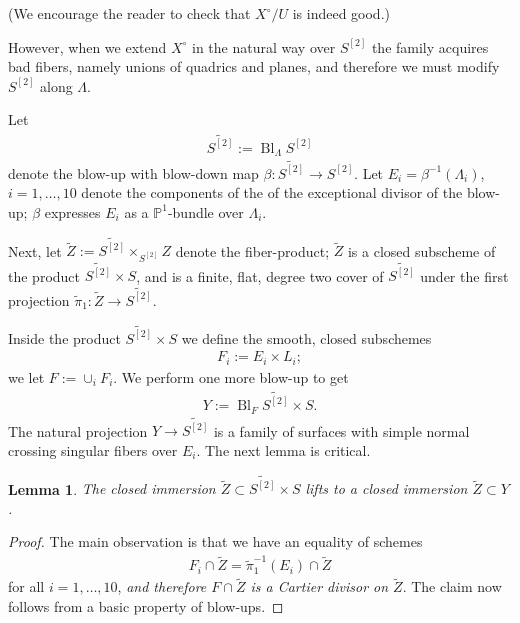 \documentclass[12 pt]{amsart}
\newtheorem{lemma}{Lemma}[section]
\renewcommand{\P}{\mathbb{P}}
\newcommand{\<}{\left\langle}
\renewcommand{\>}{\right\rangle}
\DeclareMathOperator{\Bl}{Bl}
\begin{document}
(We encourage the reader to check that $X^{\circ}/U$ is indeed good.)

However, when we extend $X^{\circ}$ in the natural way over $S^{[2]}$
the family acquires bad fibers, namely unions of quadrics and planes,
and therefore we must modify $S^{[2]}$ along $\Lambda$.

Let
\begin{align}
  \label{eq:S2tilde}
  \widetilde{S^{[2]}} := \Bl_{\Lambda}S^{[2]}
\end{align}
denote the blow-up with blow-down map
$\beta: \widetilde{S^{[2]}} \to S^{[2]}$.  Let
$E_{i} = \beta^{-1}(\Lambda_{i})$, $i=1, \dots, 10$ denote the
components of the of the exceptional divisor of the blow-up; $\beta$
expresses $E_{i}$ as a $\P^{1}$-bundle over $\Lambda_{i}$.

Next, let $\widetilde{Z} := \widetilde{S^{[2]}} \times_{S^{[2]}} Z$
denote the fiber-product; $\widetilde{Z}$ is a closed subscheme of the
product $\widetilde{S^{[2]}} \times S$, and is a finite, flat, degree
two cover of $\widetilde{S^{[2]}}$ under the first projection
$\tilde{\pi}_{1} : \widetilde{Z} \to \widetilde{S^{[2]}}.$

Inside the product $\widetilde{S^{[2]}} \times S$ we define the
smooth, closed subschemes
\begin{align}
  \label{eq:Fi}
  F_{i} := E_{i} \times L_{i};
\end{align}
we let $F := \cup_{i}F_{i}$.  We perform one more blow-up to get 
\begin{align}
  \label{eq:Xtilde}
  Y := \Bl_{F}\widetilde{S^{[2]}} \times S.
\end{align}
The natural projection $ Y \to \widetilde{S^{[2]}}$ is a family of
surfaces with simple normal crossing singular fibers over $E_{i}$.
The next lemma is critical.

\begin{lemma}
  The closed immersion
  $\widetilde{Z} \subset \widetilde{S^{[2]}} \times S$ lifts to a
  closed immersion $\widetilde{Z} \subset Y$.
\end{lemma}

\begin{proof}
  The main observation is that we have an equality of schemes
  \begin{align}
    \label{eq:Cartier}
    F_i \cap \widetilde{Z} = \widetilde{\pi}_{1}^{-1}(E_i) \cap \widetilde{Z}
  \end{align}
  for all $i=1, \dots, 10$, {\sl and therefore $F \cap \widetilde{Z}$
    is a Cartier divisor on $\widetilde{Z}$}. The claim now follows
  from a basic property of blow-ups.
\end{proof}
\end{document}
